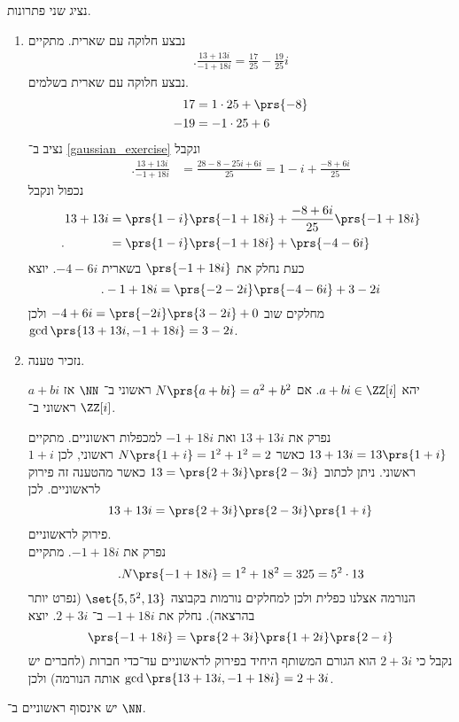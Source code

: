 \documentclass[a4paper,10pt,twoside,openany]{book}
\begin{document}
\begin{solution}
נציג שני פתרונות.
\begin{enumerate}
\item נבצע חלוקה עם שארית.
מתקיים
\begin{align} \label{gaussian_exercise}
\text{.}\frac{13 + 13i}{-1+18i} = \frac{17}{25}-\frac{19}{25}i
\end{align}
נבצע חלוקה עם שארית בשלמים.
\begin{align*}
17 &= 1\cdot 25 + \prs{-8} \\
-19 &= -1\cdot 25 + 6
\end{align*}
נציב ב־%
\ref{gaussian_exercise}
ונקבל
\begin{align*}
\text{.} \frac{13 + 13i}{-1+18i} &= \frac{28 - 8 - 25i + 6i}{25} = 1-i + \frac{-8 + 6i}{25}
\end{align*}
נכפול ונקבל
\begin{align*}
13+13i &= \prs{1-i}\prs{-1+18i} + \frac{-8 + 6i}{25}\prs{-1+18i} \\
\text{.} \phantom{13+13i} &= \prs{1-i}\prs{-1+18i} + \prs{-4 -6i}
\end{align*}
כעת נחלק את
$\prs{-1 + 18i}$
בשארית
$-4-6i$.
יוצא
\[\text{.} -1 + 18i = \prs{-2-2i}\prs{-4-6i} + 3 - 2i\]
מחלקים שוב
$-4+6i = \prs{-2i}\prs{3-2i} + 0$
ולכן
$\gcd\prs{13+13i, -1+18i} = 3-2i$.
\item
נזכיר טענה.
\begin{proposition}
יהא
$a+bi \in \ZZ[i]$.
אם
$N\prs{a+bi} = a^2 + b^2$
ראשוני ב־%
$\NN$
אז
$a+bi$
ראשוני ב־%
$\ZZ[i]$.
\end{proposition}
נפרק את
$13 + 13i$
ואת
$-1+18i$
למכפלות ראשוניים.
מתקיים
$13 + 13i = 13\prs{1+i}$
כאשר
$N\prs{1+i} = 1^2 + 1^2 = 2$
ראשוני, לכן
$1+i$
ראשוני.
ניתן לכתוב
$13 = \prs{2+3i}\prs{2-3i}$
כאשר מהטענה זה פירוק לראשוניים.
לכן
\[13+13i = \prs{2+3i}\prs{2-3i}\prs{1+i}\]
פירוק לראשוניים.
\\
נפרק את
$-1 + 18i$.
מתקיים
\[\text{.} N\prs{-1+18i} = 1^2 + 18^2 = 325 = 5^2 \cdot 13\]
הנורמה אצלנו כפלית ולכן למחלקים נורמות בקבוצה
$\set{5, 5^2, 13}$
(נפרט יותר בהרצאה).
נחלק את
$-1 + 18i$
ב־%
$2+3i$.
יוצא
\[\prs{-1+18i} = \prs{2+3i}\prs{1+2i}\prs{2-i}\]
נקבל כי $2+3i$
הוא הגורם המשותף היחיד בפירוק לראשוניים עד־כדי חברות (לחברים יש אותה הנורמה) ולכן
$\gcd\prs{13+13i, -1+18i} = 2+3i$.
\end{enumerate}
\end{solution}
\begin{theorem}[אוקלידס]
יש אינסוף ראשוניים ב־%
$\NN$.
\end{theorem}
\end{document}
